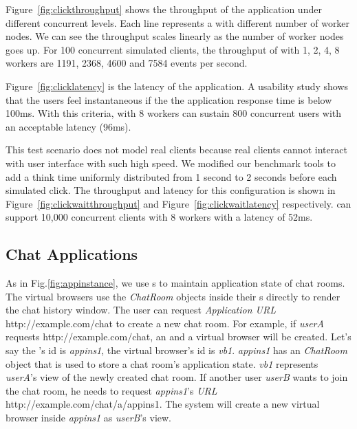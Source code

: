 \clickthroughput{}

Figure~\ref{fig:clickthroughput} shows the throughput of the application 
under different concurrent levels.
Each line represents a \cb{} with different number of worker nodes.
We can see the throughput scales linearly as the number of worker nodes goes up.
For 100 concurrent simulated clients, 
the throughput of \cb{} with 1, 2, 4, 8 workers are 1191, 2368, 4600 and 7584 events
per second.

\clicklatency{}

Figure~\ref{fig:clicklatency} is the latency of the application.
A usability study shows that the users feel instantaneous if the 
the application response time is below 100ms.
With this criteria,
\cb{} with 8 workers can sustain 800 concurrent users with an acceptable latency (96ms).

This test scenario does not model real clients because real clients cannot 
interact with user interface with such high speed.
We modified our benchmark tools to add a think time 
uniformly distributed from 1 second to 2 seconds before each simulated click.
The throughput and latency for this configuration is shown 
in Figure~\ref{fig:clickwaitthroughput} and Figure~\ref{fig:clickwaitlatency} respectively.
\cb{} can support 10,000 concurrent clients with 8 workers with a latency of 52ms.


\clickwaitthroughput{}
\clickwaitlatency{}

\subsection{Chat Applications}
As in Fig.\ref{fig:appinstance},
we use \appins{}s to maintain application state of chat rooms.
The virtual browsers use the \emph{ChatRoom} objects inside their \appins{}s 
directly to render the chat history window.
The user can request \emph{Application URL} http://example.com/chat
to create a new chat room.
For example, if 
\emph{userA} requests http://example.com/chat,
an \appins{} and a virtual browser will be created.
Let's say the \appins{}'s id is \emph{appins1},
the virtual browser's id is \emph{vb1}.
\emph{appins1} has an \emph{ChatRoom} object that is used to store 
a chat room's application state.
\emph{vb1} represents \emph{userA}'s view of the newly created
chat room.
If another user \emph{userB} wants to join the chat room, 
he needs to request \emph{appins1}'s \emph{\appins{} URL} 
http://example.com/chat/a/appins1.
The system will create a new virtual browser inside \emph{appins1}
as \emph{userB}'s view.


